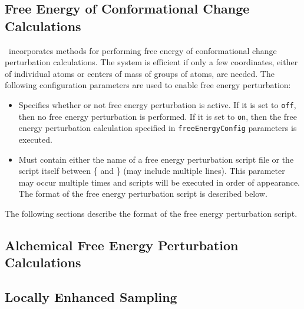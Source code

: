 \subsection{Free Energy of Conformational Change Calculations}
\label{section:fenergy}

\NAMD\ incorporates methods for performing free energy of conformational change perturbation calculations.
The system is efficient if only a few coordinates, either of individual atoms or centers of mass of groups of atoms, are needed.
The following configuration parameters are used to enable free energy perturbation:

\begin{itemize}

\item
{}
{Specifies whether or not free energy perturbation is active.  If it 
is set to {\tt off}, then no free energy perturbation is performed.  
If it is set to {\tt on}, then the free energy perturbation calculation specified in
{\tt freeEnergyConfig} parameters is executed.}

\item
{}
{Must contain either the name of a free energy perturbation script file or the script 
itself between \{ and \} (may include multiple lines).
This parameter may occur multiple times and scripts will be executed
in order of appearance.
The format of the free energy perturbation script is described below.
}

\end{itemize}

The following sections describe the format of the free energy perturbation script.




\subsection{Alchemical Free Energy Perturbation Calculations}
\label{section:alchemy}




\subsection{Locally Enhanced Sampling}
\label{section:les}

